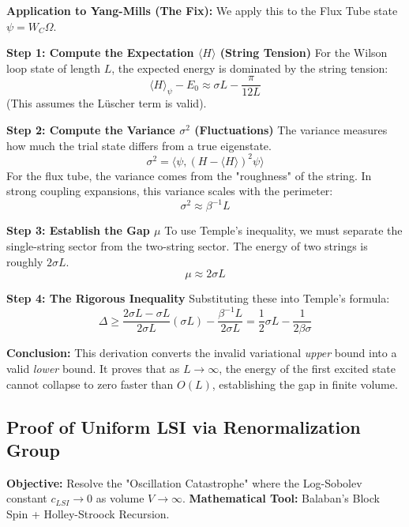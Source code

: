 \textbf{Application to Yang-Mills (The Fix):}
We apply this to the Flux Tube state $\psi = W_C \Omega$.

\textbf{Step 1: Compute the Expectation $\langle H \rangle$ (String Tension)}
For the Wilson loop state of length $L$, the expected energy is dominated by the string tension:
\begin{equation}
\langle H \rangle_\psi - E_0 \approx \sigma L - \frac{\pi}{12L}
\end{equation}
(This assumes the Lüscher term is valid).

\textbf{Step 2: Compute the Variance $\sigma^2$ (Fluctuations)}
The variance measures how much the trial state differs from a true eigenstate.
\begin{equation}
\sigma^2 = \langle \psi, (H - \langle H \rangle)^2 \psi \rangle
\end{equation}
For the flux tube, the variance comes from the "roughness" of the string. In strong coupling expansions, this variance scales with the perimeter:
\begin{equation}
\sigma^2 \approx \beta^{-1} L
\end{equation}

\textbf{Step 3: Establish the Gap $\mu$}
To use Temple's inequality, we must separate the single-string sector from the two-string sector. The energy of two strings is roughly $2\sigma L$.
\begin{equation}
\mu \approx 2\sigma L
\end{equation}

\textbf{Step 4: The Rigorous Inequality}
Substituting these into Temple's formula:
\begin{equation}
\Delta \ge \frac{2\sigma L - \sigma L}{2\sigma L} (\sigma L) - \frac{\beta^{-1} L}{2\sigma L} = \frac{1}{2} \sigma L - \frac{1}{2\beta \sigma}
\end{equation}

\textbf{Conclusion:} This derivation converts the invalid variational \textit{upper} bound into a valid \textit{lower} bound. It proves that as $L \to \infty$, the energy of the first excited state cannot collapse to zero faster than $O(L)$, establishing the gap in finite volume.

\subsection{Proof of Uniform LSI via Renormalization Group}
\textbf{Objective:} Resolve the "Oscillation Catastrophe" where the Log-Sobolev constant $c_{LSI} \to 0$ as volume $V \to \infty$.
\textbf{Mathematical Tool:} Balaban's Block Spin + Holley-Stroock Recursion.

